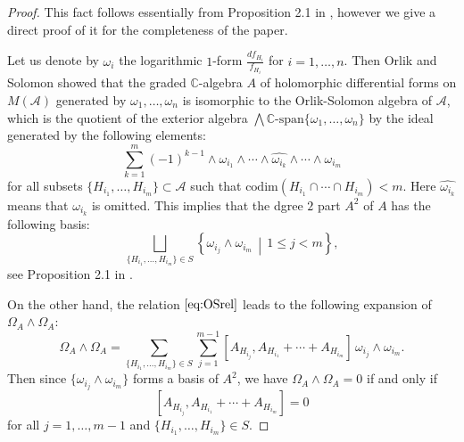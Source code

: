 \documentclass[a4paper,12pt]{article}
\theoremstyle{definition}
\theoremstyle{remark}
\begin{document}
\begin{proof}
This fact follows essentially from 
Proposition 2.1 in \cite{Koh83},  however we give a direct proof of it
for the completeness of the paper.

Let us denote by $\omega_{i}$ the logarithmic $1$-form $\frac{df_{H_{i}}}{f_{H_{i}}}$ for $i=1,\ldots,n$.
Then Orlik and Solomon \cite{OrSol80} showed that the graded $\mathbb{C}$-algebra 
$A$ of holomorphic differential forms on $M(\mathcal{A})$ generated by $\omega_{1},\ldots,\omega_{n}$ is isomorphic to the Orlik-Solomon algebra of $\mathcal{A}$, 
which is the quotient of the exterior algebra $\bigwedge\mathbb{C}\text{-span}\{\omega_{1},\ldots,\omega_{n}\}$ 
by the ideal generated by the following elements:
\begin{equation}\label{eq:OSrel}
	\sum_{k=1}^{m}(-1)^{k-1}\wedge \omega_{i_{1}}\wedge \cdots \wedge \widehat{\omega_{i_{k}}}\wedge \cdots \wedge \omega_{i_{m}}
\end{equation}
for all subsets $\{H_{i_{1}},\ldots,H_{i_{m}}\}\subset \mathcal{A}$ such that 
\(
	\mathrm{codim}(H_{i_{1}}\cap \cdots \cap H_{i_{m}})<m.
\)
Here $\widehat{\omega_{i_{k}}}$ means that $\omega_{i_{k}}$ is omitted.
This implies that the dgree $2$ part $A^{2}$ of $A$ has the following basis:
\[
	\bigsqcup_{\{H_{i_{1}},\ldots,H_{i_{m}}\}\in S}\left\{\omega_{i_{j}}\wedge \omega_{i_{m}}\,\middle|\,
		1\le j<m
	\right\},
\]
see Proposition 2.1 in \cite{Koh83}.

On the other hand, the relation $\eqref{eq:OSrel}$ leads to the following expansion of $\Omega_{A}\wedge \Omega_{A}$:
\[
		\Omega_{A}\wedge \Omega_{A}=
		\sum_{\{H_{i_{1}},\ldots,H_{i_{m}}\}\in S}\sum_{j=1}^{m-1}[A_{H_{i_{j}}},A_{H_{i_{1}}}+\cdots +A_{H_{i_{m}}}]\,\omega_{i_{j}}\wedge \omega_{i_{m}}.
\]
Then since $\{\omega_{i_{j}}\wedge \omega_{i_{m}}\}$ forms a basis of $A^{2}$, 
we have $\Omega_{A}\wedge \Omega_{A}=0$ if and only if 
\[
[A_{H_{i_{j}}},A_{H_{i_{1}}}+\cdots +A_{H_{i_{m}}}]=0
\] for all $j=1,\ldots,m-1$ and $\{H_{i_{1}},\ldots,H_{i_{m}}\}\in S$.
\end{proof}
\end{document}
